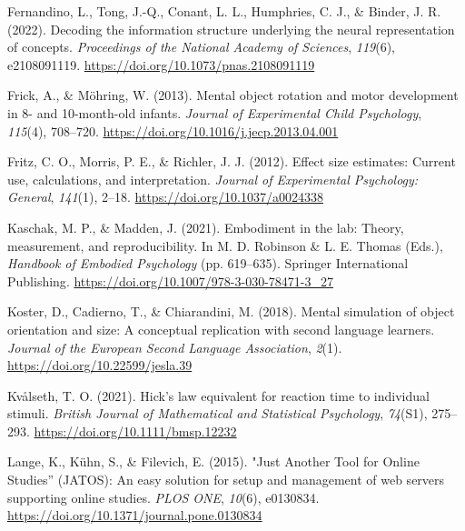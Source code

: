 \documentclass[
  man,floatsintext]{apa7}
\newlength{\cslhangindent}
\newlength{\cslentryspacingunit} %
\newenvironment{CSLReferences}[2] %
 {%
  \setlength{\parindent}{0pt}
  \ifodd #1
  \let\oldpar\par
  \def\par{\hangindent=\cslhangindent\oldpar}
  \fi
  \setlength{\parskip}{#2\cslentryspacingunit}
 }%
 {}
\begin{document}
\begin{CSLReferences}{1}{0}
\leavevmode{}%
Fernandino, L., Tong, J.-Q., Conant, L. L., Humphries, C. J., \& Binder, J. R. (2022). Decoding the information structure underlying the neural representation of concepts. \emph{Proceedings of the National Academy of Sciences}, \emph{119}(6), e2108091119. \url{https://doi.org/10.1073/pnas.2108091119}

\leavevmode{}%
Frick, A., \& Möhring, W. (2013). Mental object rotation and motor development in 8- and 10-month-old infants. \emph{Journal of Experimental Child Psychology}, \emph{115}(4), 708--720. \url{https://doi.org/10.1016/j.jecp.2013.04.001}

\leavevmode{}%
Fritz, C. O., Morris, P. E., \& Richler, J. J. (2012). Effect size estimates: Current use, calculations, and interpretation. \emph{Journal of Experimental Psychology: General}, \emph{141}(1), 2--18. \url{https://doi.org/10.1037/a0024338}

\leavevmode{}%
Kaschak, M. P., \& Madden, J. (2021). Embodiment in the {lab}: {Theory}, {measurement}, and {reproducibility}. In M. D. Robinson \& L. E. Thomas (Eds.), \emph{Handbook of {Embodied Psychology}} (pp. 619--635). {Springer International Publishing}. \url{https://doi.org/10.1007/978-3-030-78471-3_27}

\leavevmode{}%
Koster, D., Cadierno, T., \& Chiarandini, M. (2018). Mental simulation of object orientation and size: {A} conceptual replication with second language learners. \emph{Journal of the European Second Language Association}, \emph{2}(1). \url{https://doi.org/10.22599/jesla.39}

\leavevmode{}%
Kvålseth, T. O. (2021). Hick's law equivalent for reaction time to individual stimuli. \emph{British Journal of Mathematical and Statistical Psychology}, \emph{74}(S1), 275--293. \url{https://doi.org/10.1111/bmsp.12232}

\leavevmode{}%
Lange, K., Kühn, S., \& Filevich, E. (2015). "{Just Another Tool} for {Online Studies}'' ({JATOS}): {An} easy solution for setup and management of web servers supporting online studies. \emph{PLOS ONE}, \emph{10}(6), e0130834. \url{https://doi.org/10.1371/journal.pone.0130834}


\end{CSLReferences}
\end{document}
